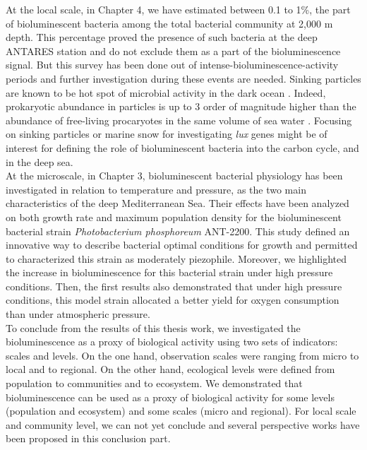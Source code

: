 At the local scale, in Chapter 4, we have estimated between 0.1 to 1\%, the part of bioluminescent bacteria among the total bacterial community at 2,000 m depth. This percentage proved the presence of such bacteria at the deep ANTARES station and do not exclude them as a part of the bioluminescence signal. But this survey has been done out of intense-bioluminescence-activity periods and further investigation during these events are needed. Sinking particles are known to be hot spot of microbial activity in the dark ocean \citep{cho1988,turley2002,long2001,azam2001}. Indeed, prokaryotic abundance in particles is up to 3 order of magnitude higher than the abundance of free-living procaryotes in the same volume of sea water \citep{turley1995}. Focusing on sinking particles or marine snow for investigating \textit{lux} genes might be of interest for defining the role of bioluminescent bacteria into the carbon cycle, and in the deep sea.\\ 

At the microscale, in Chapter 3, bioluminescent bacterial physiology has been investigated in relation to temperature and pressure, as the two main characteristics of the deep Mediterranean Sea. Their effects have been analyzed on both growth rate and maximum population density for the bioluminescent bacterial strain \textit{Photobacterium phosphoreum} ANT-2200. This study defined an innovative way to describe bacterial optimal conditions for growth and permitted to characterized this strain as moderately piezophile. Moreover, we highlighted the increase in bioluminescence for this bacterial strain under high pressure conditions. Then, the first results also demonstrated that under high pressure conditions, this model strain allocated a better yield for oxygen consumption than under atmospheric pressure.\\ 

To conclude from the results of this thesis work, we investigated the bioluminescence as a proxy of biological activity using two sets of indicators: scales and levels. On the one hand, observation scales were ranging from micro to local and to regional. On the other hand, ecological levels were defined from population to communities and to ecosystem. We demonstrated that bioluminescence can be used as a proxy of biological activity for some levels (population and ecosystem) and some scales (micro and regional). For local scale and community level, we can not yet conclude and several perspective works have been proposed in this conclusion part.\\


